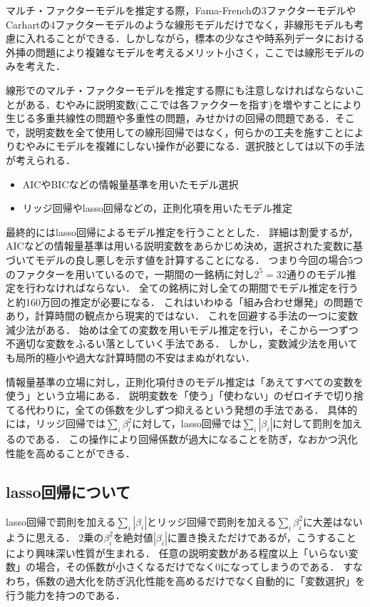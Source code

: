 \documentclass[11pt]{jreport}
\begin{document}
マルチ・ファクターモデルを推定する際，Fama-Frenchの3ファクターモデルやCarhartの4ファクターモデルのような線形モデルだけでなく，非線形モデルも考慮に入れることができる．しかしながら，標本の少なさや時系列データにおける外挿の問題により複雑なモデルを考えるメリット小さく，ここでは線形モデルのみを考えた．

線形でのマルチ・ファクターモデルを推定する際にも注意しなければならないことがある．むやみに説明変数(ここでは各ファクターを指す)を増やすことにより生じる多重共線性の問題や多重性の問題，みせかけの回帰の問題である．そこで，説明変数を全て使用しての線形回帰ではなく，何らかの工夫を施すことによりむやみにモデルを複雑にしない操作が必要になる．選択肢としては以下の手法が考えられる．

\begin{itemize}
\item AICやBICなどの情報量基準を用いたモデル選択
\item リッジ回帰やlasso回帰などの，正則化項を用いたモデル推定
\end{itemize}

最終的にはlasso回帰によるモデル推定を行うこととした．
詳細は割愛するが，AICなどの情報量基準は用いる説明変数をあらかじめ決め，選択された変数に基づいてモデルの良し悪しを示す値を計算することになる．
つまり今回の場合5つのファクターを用いているので，一期間の一銘柄に対し$2^5 = 32$通りのモデル推定を行わなければならない．
全ての銘柄に対し全ての期間でモデル推定を行うと約160万回の推定が必要になる．
これはいわゆる「組み合わせ爆発」の問題であり，計算時間の観点から現実的ではない．
これを回避する手法の一つに変数減少法がある．
始めは全ての変数を用いモデル推定を行い，そこから一つずつ不適切な変数をふるい落としていく手法である．
しかし，変数減少法を用いても局所的極小や過大な計算時間の不安はまぬがれない．

情報量基準の立場に対し，正則化項付きのモデル推定は「あえてすべての変数を使う」という立場にある．
説明変数を「使う」「使わない」のゼロイチで切り捨てる代わりに，全ての係数を少しずつ抑えるという発想の手法である．
具体的には，リッジ回帰では$\sum_i\beta_i^2$に対して，lasso回帰では$\sum_i | \beta_i |$に対して罰則を加えるのである．
この操作により回帰係数が過大になることを防ぎ，なおかつ汎化性能を高めることができる．


\subsection{lasso回帰について}
lasso回帰で罰則を加える$\sum_i | \beta_i |$とリッジ回帰で罰則を加える$\sum_i\beta_i^2$に大差はないように思える．
2乗の$\beta_i^2$を絶対値$|\beta_i|$に置き換えただけであるが，こうすることにより興味深い性質が生まれる．
任意の説明変数がある程度以上「いらない変数」の場合，その係数が小さくなるだけでなく$0$になってしまうのである．
すなわち，係数の過大化を防ぎ汎化性能を高めるだけでなく自動的に「変数選択」を行う能力を持つのである．
\end{document}
